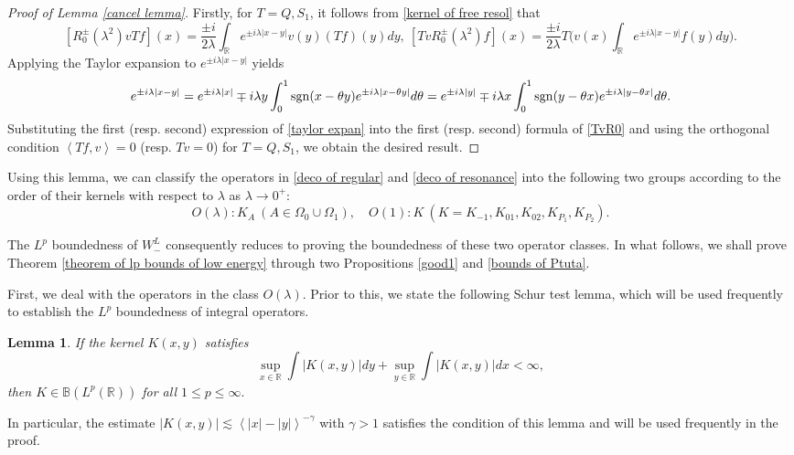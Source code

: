 \documentclass[reqno]{amsart}
\newtheorem{lemma}[definition]{Lemma}
\newcommand\R{\mathbb{R}}
\newcommand\B{\mathbb{B}}
\numberwithin{equation}{section}
\begin{document}
\begin{proof}[Proof of Lemma {\rm\ref{cancel lemma}}] Firstly, for $T=Q,S_1$, it follows from \eqref{kernel of free resol} that 
\begin{equation}\label{TvR0}
[R^{\pm}_{0}(\lambda^{2})vTf](x)=\frac{\pm i}{2\lambda}\int_{\R}^{}e^{\pm i \lambda|x-y|}v(y)(Tf)(y)dy,\ [TvR^{\pm}_{0}(\lambda^{2})f](x)=\frac{\pm i}{2\lambda}T\big(v(x)\int_{\R}^{}e^{\pm i \lambda|x-y|}f(y)dy\big) 
.
\end{equation}
Applying the Taylor expansion to $e^{\pm i\lambda|x-y|}$ yields
\begin{equation}\label{taylor expan}
e^{\pm i\lambda|x-y|}=e^{\pm i\lambda|x|}\mp i\lambda y\int_{0}^{1}{\rm sgn}(x-\theta y)e^{\pm i\lambda|x-\theta y|}d\theta=e^{\pm i\lambda|y|}\mp i\lambda x\int_{0}^{1}{\rm sgn}(y-\theta x)e^{\pm i\lambda|y-\theta x|}d\theta.
\end{equation}
Substituting the first (resp. second) expression of \eqref{taylor expan} into the first (resp. second) formula of \eqref{TvR0} and using the orthogonal condition $\left<Tf,v\right>=0$ (resp. $Tv=0$) for $T=Q,S_1$, we obtain the desired result.
\end{proof}
Using this lemma, we can classify the operators in \eqref{deco of regular} and \eqref{deco of resonance} into the following two groups according to the order of their kernels with respect to $\lambda$ as $\lambda\rightarrow0^{+}$:
\begin{equation*}
O(\lambda):K_A~(A\in\Omega_0\cup\Omega_1),\quad O(1):K~(K=K_{-1},K_{01},K_{02}, K_{P_1}, K_{P_2}).
\end{equation*}

The $L^p$ boundedness of $W^L_{-}$ consequently reduces to proving the boundedness of these two operator classes. In what follows, we shall prove Theorem \ref{theorem of lp bounds of low energy} through two Propositions \ref{good1} and \ref{bounds of Ptuta}. 

First, we deal with the operators in the class $O(\lambda)$. Prior to this, we state the following Schur test lemma, which will be used frequently to establish the $L^p$ boundedness of integral operators.
\begin{lemma}\label{shur test}
If the kernel $K(x,y)$ satisfies $$\sup_{x\in\R}\int|K(x,y)|dy+\sup_{y\in\R}\int|K(x,y)|dx<\infty,$$ then $K\in \B(L^{p}(\R))$ for all $1\leq p\leq \infty.$
\end{lemma}
In particular, the estimate $|K(x,y)|\lesssim \left<|x|-|y|\right>^{-\gamma}$ with $\gamma>1$ satisfies the condition of this lemma and will be used frequently in the proof.
\end{document}
